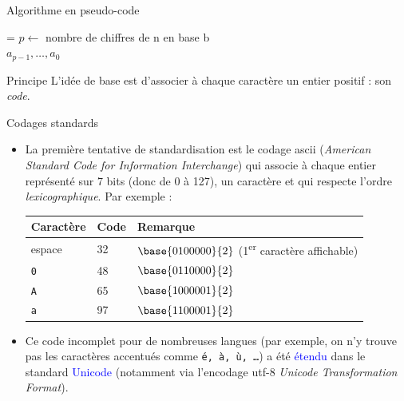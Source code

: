 \documentclass[10pt]{beamer}
\begin{document}
\begin{frame}{\Ctitle}{\stitle}
	\begin{block}{Algorithme en pseudo-code}
		\SetAlFnt{\small}
	\setlength{\algomargin}{8pt}
	\begin{algorithm}[H]
		\DontPrintSemicolon
		\caption{Conversion de la base 10 vers la base b}
		\everypar={\footnotesize \textcolor{gray}{\nl}}
		$p \leftarrow$ nombre de chiffres de n en base b\\
		\Return $a_{p-1},\dots,a_0$
	  \end{algorithm}
	\end{block}
\end{frame}


\begin{frame}{\Ctitle}{\stitle}
	\begin{alertblock}{Principe}
		L'idée de base est d'associer à chaque caractère un entier positif : son \textit{code}.
	\end{alertblock}
	\begin{block}{Codages standards}
		\begin{itemize}
		\item<2-> La première tentative de standardisation est le codage {\sc ascii} (\textit{American Standard Code for Information Interchange}) qui associe à chaque entier représenté sur \textcolor{BrickRed}{7} bits (donc de 0 à 127), un caractère et qui respecte l'ordre \textit{lexicographique}. Par exemple : \\
		\begin{tabular}{|p{2cm}|p{1cm}|p{5cm}|}
			\hline
			Caractère & Code & Remarque\\
			\hline
			espace & 32 &  $\base{0100000}{2}$ (1\textsuperscript{er} caractère affichable)\\
			{\tt 0} & 48 & $\base{0110000}{2}$\\
			{\tt A} & 65 & $\base{1000001}{2}$\\
			{\tt a} & 97 & $\base{1100001}{2}$\\
			\hline
			\end{tabular}
		 \item<3-> Ce code incomplet pour de nombreuses langues (par exemple, on n'y trouve pas les caractères accentués comme {\tt é, à, ù, \dots}) a été \textcolor{blue}{étendu} dans le standard \textcolor{blue}{Unicode} (notamment via l'encodage {\sc utf}-8 \textit{Unicode Transformation Format}).
		\end{itemize}
	\end{block}
\end{frame}
\end{document}
